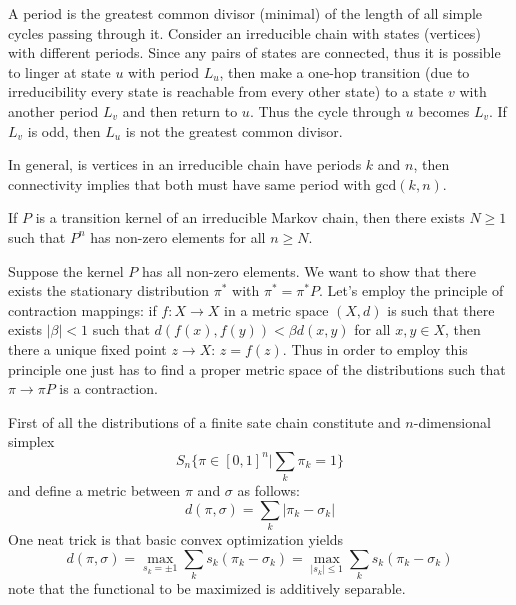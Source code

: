 \documentclass[a4paper]{article}
\begin{document}
A period is the greatest common divisor (minimal) of the length of all simple cycles
passing through it. Consider an irreducible chain with states (vertices) with different
periods. Since any pairs of states are connected, thus it is possible to linger at
state $u$ with period $L_u$, then make a one-hop transition (due to irreducibility
every state is reachable from every other state) to a state $v$ with another period
$L_v$ and then return to $u$. Thus the cycle through $u$ becomes $L_v$. If $L_v$
is odd, then $L_u$ is not the greatest common divisor.

In general, is vertices in an irreducible chain have periods $k$ and $n$, then
connectivity implies that both must have same period with $\text{gcd}(k,n)$.

If $P$ is a transition kernel of an irreducible Markov chain, then there exists
$N\geq 1$ such that $P^n$ has non-zero elements for all $n\geq N$.

Suppose the kernel $P$ has all non-zero elements. We want to show that there exists
the stationary distribution $\pi^*$ with $\pi^*=\pi^*P$. Let's employ the principle of
contraction mappings: if $f:X\to X$ in a metric space $(X,d)$ is such that there exists
$|\beta| < 1$ such that $d(f(x), f(y)) < \beta d(x,y)$ for all $x,y\in X$, then
there a unique fixed point $z\to X$: $z=f(z)$. Thus in order to employ this principle
one just has to find a proper metric space of the distributions such that $\pi \to \pi P$
is a contraction.

First of all the distributions of a finite sate chain constitute
and $n$-dimensional simplex
\[S_n \bigl\{ \pi\in [0,1]^n \big\rvert \sum_k \pi_k = 1 \bigr\}\]
and define a metric between $\pi$ and $\sigma$ as follows:
\[
d(\pi,\sigma)
= \sum_k |\pi_k-\sigma_k|
\]
One neat trick is that basic convex optimization yields
\[
d(\pi,\sigma)
= \max_{s_k = \pm 1} \sum_k s_k(\pi_k-\sigma_k)
= \max_{|s_k| \leq 1} \sum_k s_k(\pi_k-\sigma_k)
\]
note that the functional to be maximized is additively separable.
\end{document}
